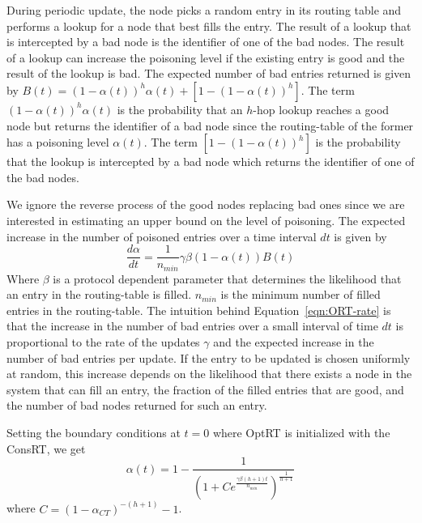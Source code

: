 \documentclass[10pt,twocolumn]{article}
\newcommand{\dd}[2]{\ensuremath{\frac{d #1}{d #2}}}
\newcommand{\pow}[2]{\ensuremath{#1}^{#2}}
\newcommand{\PRT}{OptRT\xspace}
\newcommand{\CRT}{ConsRT\xspace}
\begin{document}
During periodic update, the node picks a random entry in its routing
table and performs a lookup for a node that best fills the entry. The
result of a lookup that is intercepted by a bad node is the identifier
of one of the bad nodes.  The result of a lookup can increase the
poisoning level if the existing entry is good and the result of the
lookup is bad. The expected number of bad entries returned is given by
$B(t)=\pow{(1-\alpha(t))}{h}\alpha(t)
+\left[1-\pow{(1-\alpha(t))}{h}\right]$. The term
$\pow{(1-\alpha(t))}{h}\alpha(t)$ is the probability that an $h$-hop
lookup reaches a good node but returns the identifier of a bad node
since the routing-table of the former has a poisoning level
$\alpha(t)$. The term $\left[1-\pow{(1-\alpha(t))}{h}\right]$ is the
probability that the lookup is intercepted by a bad node which returns
the identifier of one of the bad nodes.

We ignore the reverse process of the good nodes replacing bad ones since
we are interested in estimating an upper bound on the level of
poisoning. The expected increase in the number of poisoned entries over
a time interval $dt$ is given by
\begin{equation}
\label{eqn:ORT-rate}
\dd{\alpha}{t}=\frac{1}{n_{min}}\gamma \beta (1-\alpha(t))B(t)
\end{equation}
Where $\beta$ is a protocol dependent parameter that determines the likelihood that an entry in the routing-table is filled. $n_{min}$ is the minimum number of filled entries in the routing-table. The intuition behind Equation~\ref{eqn:ORT-rate} is that the increase in the number of bad entries over a small interval of time $dt$ is proportional to the rate of the updates $\gamma$ and the expected increase in the number of bad entries per update. If the entry to be updated is chosen uniformly at random, this increase depends on the likelihood that there exists a node in the system that can fill an entry, the fraction of the filled entries that are good, and the number of bad nodes returned for such an entry.

Setting the boundary conditions at $t=0$ where \PRT is initialized with the \CRT, we get
\begin{equation}
\alpha(t)=1-\frac{1}{\pow{\left(1+C\pow{e}{\frac{\gamma\beta (h+1)t}{n_{min}}}\right)}{\frac{1}{h+1}}}
\label{eqn:PRT}
\end{equation}
where $C=\pow{(1-\alpha_{CT})}{-(h+1)}-1$.
\end{document}
